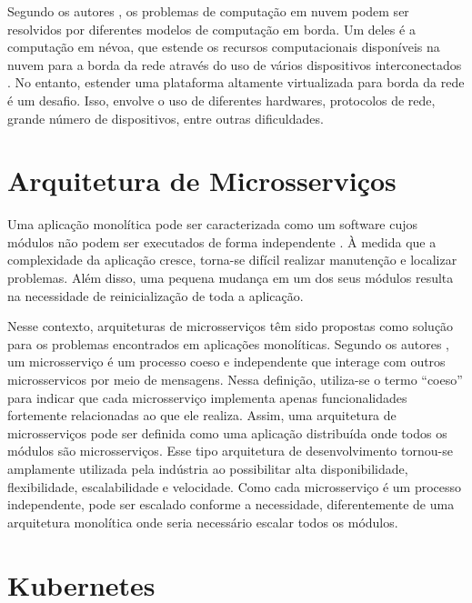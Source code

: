 Segundo os autores , os problemas de computação em nuvem podem ser resolvidos por diferentes modelos de computação em borda. Um deles é a computação em névoa, que estende os recursos computacionais disponíveis na nuvem para a borda da rede através do uso de vários dispositivos interconectados \cite{coutinho2016nevoa}. No entanto, estender uma plataforma altamente virtualizada para borda da rede é um desafio. Isso,  envolve o uso de diferentes hardwares, protocolos de rede, grande número de dispositivos, entre outras dificuldades.

\section{Arquitetura de Microsserviços}

Uma aplicação monolítica pode ser caracterizada como um software cujos módulos não podem ser executados de forma independente \cite{dragoni2017microservices}. À medida que a complexidade da aplicação cresce, torna-se difícil realizar manutenção e localizar problemas. Além disso, uma pequena mudança em um dos seus módulos resulta na necessidade de reinicialização de toda a aplicação.

Nesse contexto, arquiteturas de microsserviços têm sido propostas como solução para os problemas encontrados em aplicações monolíticas. Segundo os autores , um microsserviço é um processo coeso e independente que interage com outros microsservicos por meio de mensagens. Nessa definição, utiliza-se o termo ``coeso'' para indicar que cada microsserviço implementa apenas funcionalidades fortemente relacionadas ao que ele realiza. Assim, uma arquitetura de microsserviços pode ser definida como uma aplicação distribuída  onde todos os módulos são microsserviços. Esse tipo arquitetura de desenvolvimento tornou-se amplamente utilizada pela indústria ao possibilitar alta disponibilidade, flexibilidade, escalabilidade e velocidade. Como cada microsserviço é um processo independente, pode ser escalado conforme a necessidade, diferentemente de uma arquitetura monolítica onde seria necessário escalar todos os módulos.


\section{Kubernetes}

